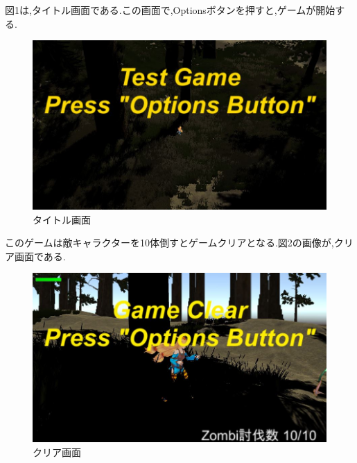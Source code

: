 \documentclass[a4paper]{jarticle}
\begin{document}
        図1は,タイトル画面である.この画面で,Optionsボタンを押すと,ゲームが開始する.\\
        \begin{figure}[h]
          \centering
          \includegraphics[keepaspectratio, scale=0.5]
               {images/Shindo/start.JPG}
          \caption{タイトル画面}
         \end{figure}
         
         このゲームは敵キャラクターを10体倒すとゲームクリアとなる.図2の画像が,クリア画面である.\\
		\begin{figure}[h]
          \centering
          \includegraphics[keepaspectratio, scale=0.5]
               {images/Shindo/clear.JPG}
          \caption{クリア画面}
         \end{figure}
        
\end{document}

